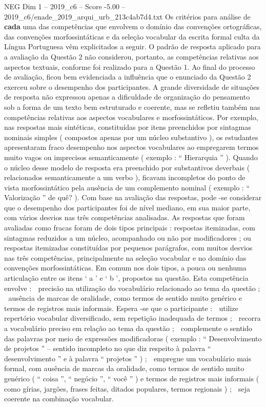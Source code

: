 \begin{textsample}{NEG Dim 1 – 2019\_c6 – Score -5.00 – 2019\_c6/enade\_2019\_arqui\_urb\_213c4ab7d4.txt}
Os critérios para análise de \textbf{cada} uma das competências que envolvem o domínio das convenções ortográficas, das convenções morfossintáticas e da seleção vocabular da escrita formal culta da Língua Portuguesa vêm explicitados a seguir.
O padrão de resposta aplicado para a avaliação da Questão 2 não considerou, portanto, as competências relativas aos aspectos textuais, conforme foi realizado para a Questão 1.
Ao final do processo de avaliação, ficou bem evidenciada a influência que o enunciado da Questão 2 exerceu sobre o desempenho dos participantes.
A grande diversidade de situações de resposta não expressou apenas a dificuldade de organização do pensamento sob a forma de um texto bem estruturado e coerente, mas se refletiu também nas competências relativas aos aspectos vocabulares e morfossintáticos.
Por exemplo, nas respostas mais sintéticas, constituídas por itens preenchidos por sintagmas nominais simples ( compostos apenas por um núcleo substantivo ), os estudantes apresentaram fraco desempenho nos aspectos vocabulares ao empregarem termos muito vagos ou imprecisos semanticamente ( exemplo : “ Hierarquia ” ).
Quando o núcleo desse modelo de resposta era preenchido por substantivos deverbais ( relacionados semanticamente a um verbo ), ficavam incompletos do ponto de vista morfossintático pela ausência de um complemento nominal ( exemplo : “ Valorização ” de quê? ).
Com base na avaliação das respostas, pode -se considerar que o desempenho dos participantes foi de nível mediano, em sua maior parte, com vários desvios nas três competências analisadas.
As respostas que foram avaliadas como fracas foram de dois tipos principais : respostas itemizadas, com sintagmas reduzidos a um núcleo, acompanhado ou não por modificadores ; ou respostas itemizadas constituídas por pequenos parágrafos, com muitos desvios nas três competências, principalmente na seleção vocabular e no domínio das convenções morfossintáticas.
Em comum nos dois tipos, a pouca ou nenhuma articulação entre os itens ‘ a ’ e ‘ b ’, propostos na questão.
Esta competência envolve :  precisão na utilização do vocabulário relacionado ao tema da questão ;  ausência de marcas de oralidade, como termos de sentido muito genérico e termos de registros mais informais.
Espera -se que o participante :  utilize repertório vocabular diversificado, sem repetição inadequada de termos ;  recorra a vocabulário preciso em relação ao tema da questão ;  complemente o sentido das palavras por meio de expressões modificadoras ( exemplo : “ Desenvolvimento de projetos ” – sentido incompleto no que diz respeito à palavra “ desenvolvimento ” e à palavra “ projetos ” ) ;  empregue um vocabulário mais formal, com ausência de marcas da oralidade, como termos de sentido muito genérico ( “ coisa ”, “ negócio ”, “ você ” ) e termos de registros mais informais ( como gírias, jargões, frases feitas, ditados populares, termos regionais ) ;  seja coerente na combinação vocabular.

\end{textsample}
